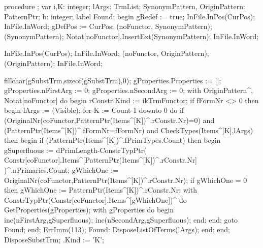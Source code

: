 \nwenddocs{}\endmoddef\nwstartdeflinemarkup{}\nwenddeflinemarkup
procedure ;
var
   i,K: integer;
   lArgs: TrmList;
   SynonymPattern, OriginPattern: PatternPtr;
   b: integer;
label Found;
begin
   gRedef := true;
   InFile.InPos(CurPos);
   InFile.InWord;
   gDefPos := CurPos;
   (noFunctor, SynonymPattern);
   (SynonymPattern);
   Notat[noFunctor].InsertExt(SynonymPattern);
   InFile.InWord;
   
   InFile.InPos(CurPos);
   InFile.InWord;
   (noFunctor, OriginPattern);
   (OriginPattern);
   InFile.InWord;
   
   fillchar(gSubstTrm,sizeof(gSubstTrm),0);
   gProperties.Properties := [];
   gProperties.nFirstArg := 0;
   gProperties.nSecondArg := 0;
   with OriginPattern^, Notat[noFunctor] do
   begin
      rConstr.Kind := ikTrmFunctor;
      if fFormNr <> 0 then
      begin
         lArgs := (Visible);
         for K := Count-1 downto 0 do
            if (OriginalNr(coFunctor,PatternPtr(Items^[K])^.rConstr.Nr)=0) and
                  (PatternPtr(Items^[K])^.fFormNr=fFormNr) and
                  CheckTypes(Items^[K],lArgs) then
            begin
               if (PatternPtr(Items^[K])^.fPrimTypes.Count) then
               begin
                  gSuperfluous := dPrimLength-ConstrTypPtr(
                     Constr[coFunctor].Items^[PatternPtr(Items^[K])^.rConstr.Nr]
                                                          )^.nPrimaries.Count;
                  gWhichOne := OriginalNr(coFunctor,PatternPtr(Items^[K])^.rConstr.Nr);
                  if gWhichOne = 0 then
                     gWhichOne := PatternPtr(Items^[K])^.rConstr.Nr;
                  with ConstrTypPtr(Constr[coFunctor].Items^[gWhichOne])^ do
                     GetProperties(gProperties);
                  with gProperties do
                  begin
                     inc(nFirstArg,gSuperfluous);
                     inc(nSecondArg,gSuperfluous);
                  end;
               end;
               goto Found;
            end;
         ErrImm(113);
         Found:
            DisposeListOfTerms(lArgs);
      end;
   end;
   DisposeSubstTrm;
   .Kind := 'K';
   
